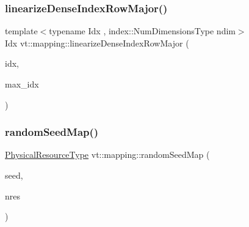 \mbox{\label{namespacevt_1_1mapping_abcd5f8f5e5c974ef83eaa87eeeb416a6}} 
\subsubsection{\texorpdfstring{linearize\+Dense\+Index\+Row\+Major()}{linearizeDenseIndexRowMajor()}}
{\footnotesize\ttfamily template$<$typename Idx , index\+::\+Num\+Dimensions\+Type ndim$>$ \\
Idx vt\+::mapping\+::linearize\+Dense\+Index\+Row\+Major (\begin{DoxyParamCaption}\item[{\hyperlink{namespacevt_ac016d9c31465ce11c14eab2be11f9183}{Dense\+Index}$<$ Idx, ndim $>$ $\ast$}]{idx,  }\item[{\hyperlink{namespacevt_ac016d9c31465ce11c14eab2be11f9183}{Dense\+Index}$<$ Idx, ndim $>$ $\ast$}]{max\+\_\+idx }\end{DoxyParamCaption})}

\mbox{\label{namespacevt_1_1mapping_ab517203040d5d053a2293de5ea58bcf1}} 
\subsubsection{\texorpdfstring{random\+Seed\+Map()}{randomSeedMap()}}
{\footnotesize\ttfamily \hyperlink{namespacevt_a2dc36fcada816dc6d11774d650328ee9}{Physical\+Resource\+Type} vt\+::mapping\+::random\+Seed\+Map (\begin{DoxyParamCaption}\item[{\hyperlink{namespacevt_ae2e13198bdef4d5b8e603d6c1c7f0969}{Seed\+Type}}]{seed,  }\item[{\hyperlink{namespacevt_a2dc36fcada816dc6d11774d650328ee9}{Physical\+Resource\+Type}}]{nres }\end{DoxyParamCaption})}

\mbox{\label{namespacevt_1_1mapping_a35fdd9ccfcee759a8c0ba29b5c61d2a5}} 
